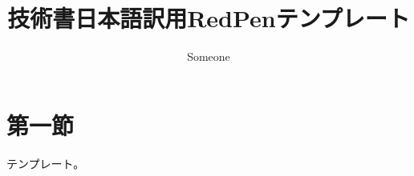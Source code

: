 \documentclass{jsarticle}
\title{技術書日本語訳用RedPenテンプレート}
\author{Someone}
\begin{document}
\maketitle
\section{第一節}

テンプレート。 
\end{document}
